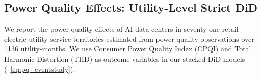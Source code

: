 \documentclass[sigconf]{acmart}
\begin{document}
\subsection{Power Quality Effects: Utility-Level Strict DiD}



We report the power quality effects of AI data centers in seventy one retail electric utility service territories estimated from power quality observations over 1136 utility-months. We use Consumer Power Quality Index (CPQI) and Total Harmonic Distortion (THD) as outcome variables in our stacked DiD models (~\autoref{eq:pq_eventstudy}). 
\end{document}
